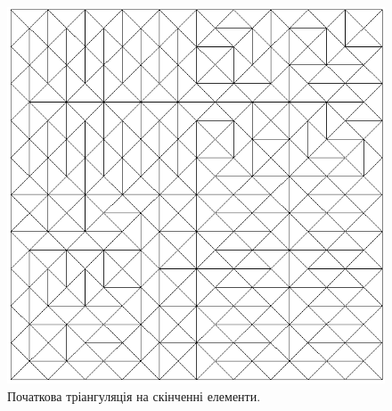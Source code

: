 \begin{figure}[H]
	\centering
    \includegraphics[scale=0.7]{problem1/InitialMesh}
    \caption{Початкова тріангуляція на скінченні елементи.}
    \label{fig:init_mesh1}
\end{figure}


